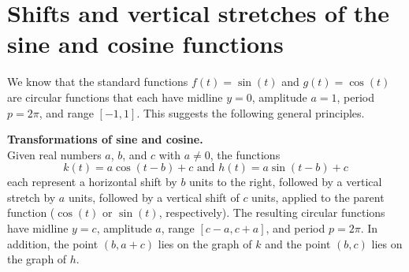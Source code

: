 \documentclass{ximera}
\begin{document}
%
%
%
\section{Shifts and vertical stretches of the sine and cosine functions}
We know that the standard functions \(f(t) = \sin(t)\) and \(g(t) = \cos(t)\) are circular functions that each have midline \(y = 0\), amplitude \(a = 1\), period \(p = 2\pi\), and range \([-1,1]\). This suggests the following general principles.%
\begin{callout}
\textbf{Transformations of sine and cosine.}\\
Given real numbers \(a\), \(b\), and \(c\) with \(a \ne 0\), the functions%
\[
k(t) = a\cos(t-b)+c \text{ and } h(t) = a\sin(t-b) + c
\]
each represent a horizontal shift by \(b\) units to the right, followed by a vertical stretch by \(a\) units, followed by a vertical shift of \(c\) units, applied to the parent function (\(\cos(t)\) or \(\sin(t)\), respectively).  The resulting circular functions have midline \(y = c\), amplitude \(a\), range \([c-a,c+a]\), and period \(p = 2\pi\).  In addition, the point \((b,a+c)\) lies on the graph of \(k\) and the point \((b,c)\) lies on the graph of \(h\).%
\end{callout}
\end{document}

